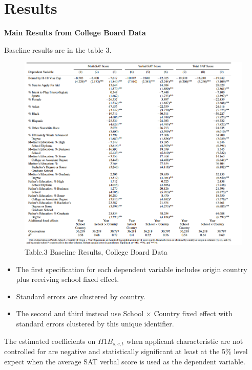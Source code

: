 \documentclass[../root]{subfiles}
\begin{document}
   \section{Results}
   
   {\bf Main Results from College Board Data}
   
   Baseline results are in the table 3.
   
   \begin{figure}
        \centering
        \includegraphics[width = \linewidth]{1016sugiyama/Table_3.png}
        \caption{Table.3 Baseline Results, College Board Data}
        \label{fig:my_label}
    \end{figure}
   
   \begin{itemize}
       \item The first specification for each dependent variable  includes origin country plus receiving school fixed effect.
       \item Standard errors are clustered by country.
       \item The second and third instead use School $\times$ Country fixed effect with standard errors clustered by this unique identifier. 
   \end{itemize}
   
   The estimated coefficients on $H1B_{s,c,t}$ when applicant characteristic are not controlled for are negative and statistically significant at least at the 5\% level expect when the average SAT verbal score is used as the dependent variable. 
   
\end{document}
